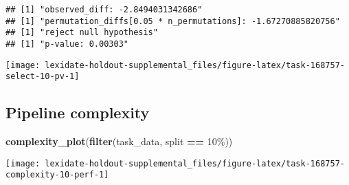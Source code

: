 \documentclass[
]{book}
\newenvironment{Shaded}{\begin{snugshade}}{\end{snugshade}}
\newcommand{\AttributeTok}[1]{\textcolor[rgb]{0.13,0.29,0.53}{#1}}
\newcommand{\DecValTok}[1]{\textcolor[rgb]{0.00,0.00,0.81}{#1}}
\newcommand{\FunctionTok}[1]{\textcolor[rgb]{0.13,0.29,0.53}{\textbf{#1}}}
\newcommand{\NormalTok}[1]{#1}
\newcommand{\OtherTok}[1]{\textcolor[rgb]{0.56,0.35,0.01}{#1}}
\newcommand{\SpecialCharTok}[1]{\textcolor[rgb]{0.81,0.36,0.00}{\textbf{#1}}}
\newcommand{\StringTok}[1]{\textcolor[rgb]{0.31,0.60,0.02}{#1}}
\begin{document}
\begin{Shaded}
\end{Shaded}

\begin{verbatim}
## [1] "observed_diff: -2.8494031342686"
## [1] "permutation_diffs[0.05 * n_permutations]: -1.67270885820756"
## [1] "reject null hypothesis"
## [1] "p-value: 0.00303"
\end{verbatim}

\texttt{[image: lexidate-holdout-supplemental\_files/figure-latex/task-168757-select-10-pv-1]}

\hypertarget{pipeline-complexity-20}{%
\subsection{Pipeline complexity}\label{pipeline-complexity-20}}

\begin{Shaded}
\begin{Highlighting}[]
\FunctionTok{complexity\_plot}\NormalTok{(}\FunctionTok{filter}\NormalTok{(task\_data, split }\SpecialCharTok{==} \StringTok{\textquotesingle{}10\%\textquotesingle{}}\NormalTok{))}
\end{Highlighting}
\end{Shaded}

\texttt{[image: lexidate-holdout-supplemental\_files/figure-latex/task-168757-complexity-10-perf-1]}
\end{document}
